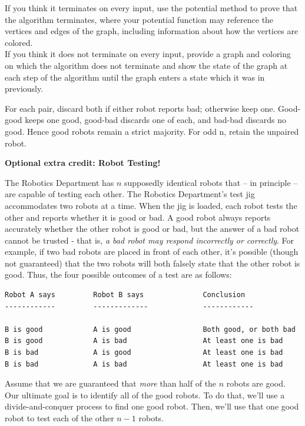 \documentclass[11pt,addpoints,answers]{exam}
\begin{document}
\begin{questions}
    
    If you think it terminates on every input, use the potential method to prove that the algorithm terminates, where your potential function may reference the vertices and edges of the graph, including information about how the vertices are colored.\\
    If you think it does not terminate on every input, provide a graph and coloring on which the algorithm does not terminate and show the state of the graph at each step of the algorithm until the graph enters a state which it was in previously.


    \begin{solution}
For each pair, discard both if either robot reports bad; otherwise keep one. Good-good keeps one good, good-bad discards one of each, and bad-bad discards no good. Hence good robots remain a strict majority. For odd n, retain the unpaired robot.
\end{solution}


\bonusquestion[3] \textbf{Optional extra credit: Robot Testing!} 

The Robotics Department has $n$ supposedly identical robots that  -- in principle -- are capable of testing each other.  The Robotics Department's test jig accommodates two robots at a time. When the jig is loaded, each robot tests the other and reports whether it is good or bad. A good robot always reports accurately whether the other robot is good or bad, but the answer of a bad robot cannot be trusted - that is, \textit{a bad robot may respond incorrectly or correctly}. For example, if two bad robots are placed in front of each other, it's possible (though not guaranteed) that the two robots will both falsely state that the other robot is good. Thus, the four possible outcomes of a test are as follows:

\begin{verbatim}
Robot A says         Robot B says              Conclusion
------------         -------------             ------------

B is good            A is good                 Both good, or both bad
B is good            A is bad                  At least one is bad
B is bad             A is good                 At least one is bad
B is bad             A is bad                  At least one is bad
\end{verbatim}

Assume that we are guaranteed that \emph{more} than half of the $n$ robots are good.  Our ultimate goal is to identify all of the good robots.  To do that, we'll use a divide-and-conquer process to find one good robot.  Then, we'll use that one good robot to test each of the other $n-1$ robots.


\end{questions}
\end{document}
